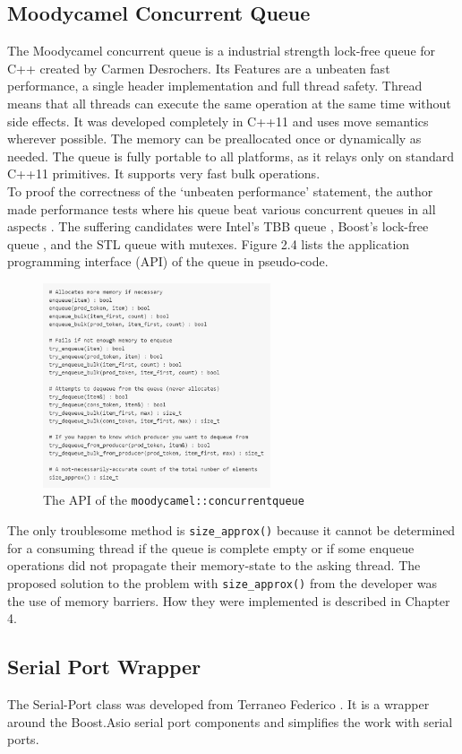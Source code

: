 \subsection{Moodycamel Concurrent Queue}
The Moodycamel concurrent queue is a industrial strength lock-free queue for C++ created by Carmen Desrochers. Its Features are a unbeaten fast performance, a single header implementation and full thread safety. Thread means that all threads can execute the same operation at the same time without side effects. It was developed completely in C++11 and uses move semantics wherever possible. The memory can be preallocated once or dynamically as needed. The queue is fully portable to all platforms, as it relays only on standard C++11 primitives. It supports very fast bulk operations. \cite{moody}\\
To proof the correctness of the `unbeaten performance' statement, the author made performance tests where his queue beat various concurrent queues in all aspects \cite{benchmark}. The suffering candidates were Intel's TBB queue \cite{intel_tbb}, Boost's lock-free queue \cite{boost_lockfree}, and the STL queue \cite{std_queue} with mutexes. Figure 2.4 lists the application programming interface (API) of the queue in pseudo-code.
\begin{figure}[h]
\centering
      \includegraphics[width=0.6\textwidth]{moody}
        \caption{The API of the \texttt{moodycamel::concurrentqueue}}
\end{figure}
The only troublesome method is \texttt{size\_approx()} because it cannot be determined for a consuming thread if the queue is complete empty or if some enqueue operations did not propagate their memory-state to the asking thread. The proposed solution to the problem with \texttt{size\_approx()} from the developer was the use of memory barriers. How they were implemented is described in Chapter 4.
\subsection{Serial Port Wrapper}
The Serial-Port class was developed from Terraneo Federico \cite{serport}. It is a wrapper around the Boost.Asio serial port components and simplifies the work with serial ports. 